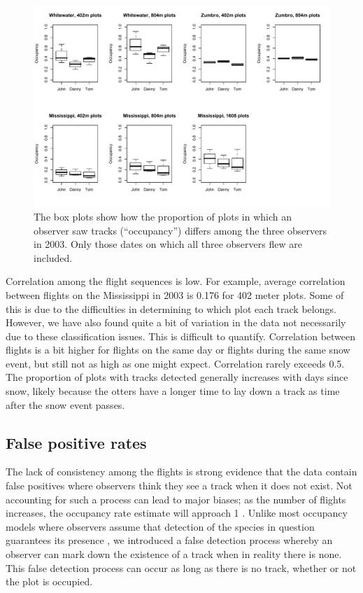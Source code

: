 \documentclass[12pt]{article}
\begin{document}
    \begin{figure}
        \centering
        \includegraphics[width=5in]{observerPlots.pdf}
        \caption{The box plots show how the proportion of plots in which an
        observer saw tracks (``occupancy'') differs among the three observers in
        2003. Only those dates on which all three observers flew are included.}
        \label{obsPlots}
    \end{figure}

    Correlation among the flight sequences is low. For example, average
    correlation between flights on the Mississippi in 2003 is 0.176 for 402
    meter plots. Some of this is due to the difficulties in determining to which
    plot each track belongs. However, we have also found quite a bit of
    variation in the data not necessarily due to these classification issues.
    This is difficult to quantify. Correlation between flights is a bit higher
    for
    flights on the same day or flights during the same snow event, but still not
    as high as one might expect. Correlation rarely exceeds 0.5. The proportion
    of plots with tracks detected
    generally increases with days since snow, likely because the otters have a
    longer time to lay down a track as time after the snow event passes.

    \subsection{False positive rates}
    The lack of consistency among the flights is strong evidence that the data
    contain false positives where observers think they see a track when it does
    not exist. Not accounting for such a process can lead to major biases; as
    the number of flights increases, the occupancy rate estimate will approach
    1 \cite{Royle2006}. Unlike most occupancy models where observers assume
    that detection of the species in question guarantees its presence \cite
    {MacKenzie2006}, we introduced a false detection process whereby an observer
    can mark down the existence of a track when in reality there is none. This
    false detection process can occur as long as there is no track, whether or
    not the plot is occupied.
\end{document}

